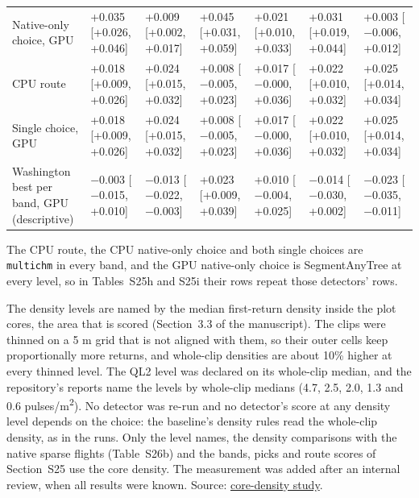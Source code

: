 \documentclass[10pt,a4paper]{article}
\makeatletter
\newcommand\suppFloatBarrier{\par\addpenalty\z@
  \ifx\@deferlist\@empty\else\expandafter\supp@flush\fi}
\newcommand\supp@flush{\let\supp@waiting\@deferlist
  \newpage
  \ifx\@deferlist\supp@waiting\null\newpage\fi
  \ifx\@deferlist\supp@waiting\expandafter\clearpage\else\expandafter\suppFloatBarrier\fi}
\gdef\supp@afterheading{}
\renewcommand\section{\suppFloatBarrier
    \gdef\supp@afterheading{\suppressfloats[t]\gdef\supp@afterheading{}}\supp@section}}
\makeatother
\begin{document}
{\begin{xltabular}{\textwidth}{LLLLLLL}
Native-only choice, GPU & +0.035 [+0.026, +0.046] & +0.009 [+0.002, +0.017] & +0.045 [+0.031, +0.059] & +0.021 [+0.010, +0.033] & +0.031 [+0.019, +0.044] & +0.003 [$-$0.006, +0.012] \\
CPU route & +0.018 [+0.009, +0.026] & +0.024 [+0.015, +0.032] & +0.008 [$-$0.005, +0.023] & +0.017 [$-$0.000, +0.036] & +0.022 [+0.010, +0.032] & +0.025 [+0.014, +0.034] \\
Single choice, GPU & +0.018 [+0.009, +0.026] & +0.024 [+0.015, +0.032] & +0.008 [$-$0.005, +0.023] & +0.017 [$-$0.000, +0.036] & +0.022 [+0.010, +0.032] & +0.025 [+0.014, +0.034] \\
Washington best per band, GPU (descriptive) & $-$0.003 [$-$0.015, +0.010] & $-$0.013 [$-$0.022, $-$0.003] & +0.023 [+0.009, +0.039] & +0.010 [$-$0.004, +0.025] & $-$0.014 [$-$0.030, +0.002] & $-$0.023 [$-$0.035, $-$0.011] \\
\end{xltabular}
}

The CPU route, the CPU native-only choice and both single choices are
\texttt{multichm} in every band, and the GPU native-only choice is SegmentAnyTree at
every level, so in Tables~S25h and S25i their rows repeat those detectors'
rows.

\section*{S26. Density inside the plot cores}

The density levels are named by the median first-return density inside the plot
cores, the area that is scored (Section~3.3 of the manuscript). The clips were
thinned on a 5 m grid that is not aligned with them, so their outer cells keep
proportionally more returns, and whole-clip densities are about 10\% higher at
every thinned level. The QL2 level was declared on its whole-clip median, and
the repository's reports name the levels by whole-clip medians (4.7, 2.5, 2.0,
1.3 and 0.6 pulses/m\textsuperscript{2}). No detector was re-run and no detector's score at any
density level depends on the choice: the baseline's density rules read the
whole-clip density, as in the runs. Only the level names, the density
comparisons with the native sparse flights (Table~S26b) and the bands, picks
and route scores of Section~S25 use the core density. The measurement was added
after an internal review, when all results were known. Source: \href{https://github.com/devakellc/lidar-tree-benchmark/blob/main/results/core-density-results.md}{core-density
study}.
\end{document}
